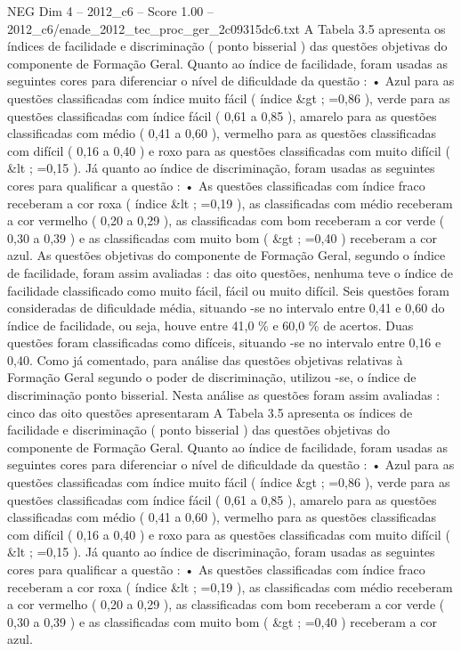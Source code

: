 \begin{textsample}{NEG Dim 4 – 2012\_c6 – Score 1.00 – 2012\_c6/enade\_2012\_tec\_proc\_ger\_2c09315dc6.txt}
A Tabela 3.5 apresenta os índices de facilidade e discriminação ( ponto bisserial ) das questões objetivas do componente de Formação Geral.
Quanto ao índice de facilidade, foram usadas as seguintes cores para diferenciar o nível de dificuldade da questão : • Azul para as questões classificadas com índice muito fácil ( índice \&gt ; =0,86 ), verde para as questões classificadas com índice fácil ( 0,61 a 0,85 ), amarelo para as questões classificadas com médio ( 0,41 a 0,60 ), vermelho para as questões classificadas com difícil ( 0,16 a 0,40 ) e roxo para as questões classificadas com muito difícil ( \&lt ; =0,15 ).
Já quanto ao índice de discriminação, foram usadas as seguintes cores para qualificar a questão : • As questões classificadas com índice fraco receberam a cor roxa ( índice \&lt ; =0,19 ), as classificadas com médio receberam a cor vermelho ( 0,20 a 0,29 ), as classificadas com bom receberam a cor verde ( 0,30 a 0,39 ) e as classificadas com muito bom ( \&gt ; =0,40 ) receberam a cor azul.
As questões objetivas do componente de Formação Geral, segundo o índice de facilidade, foram assim avaliadas : das oito questões, nenhuma teve o índice de facilidade classificado como muito fácil, fácil ou muito difícil.
Seis questões foram consideradas de dificuldade média, situando -se no intervalo entre 0,41 e 0,60 do índice de facilidade, ou seja, houve entre 41,0 \% e 60,0 \% de acertos.
Duas questões foram classificadas como difíceis, situando -se no intervalo entre 0,16 e 0,40.
Como já comentado, para análise das questões objetivas relativas à Formação Geral segundo o poder de discriminação, utilizou -se, o índice de discriminação ponto bisserial.
Nesta análise as questões foram assim avaliadas : cinco das oito questões apresentaram A Tabela 3.5 apresenta os índices de facilidade e discriminação ( ponto bisserial ) das questões objetivas do componente de Formação Geral.
Quanto ao índice de facilidade, foram usadas as seguintes cores para diferenciar o nível de dificuldade da questão : • Azul para as questões classificadas com índice muito fácil ( índice \&gt ; =0,86 ), verde para as questões classificadas com índice fácil ( 0,61 a 0,85 ), amarelo para as questões classificadas com médio ( 0,41 a 0,60 ), vermelho para as questões classificadas com difícil ( 0,16 a 0,40 ) e roxo para as questões classificadas com muito difícil ( \&lt ; =0,15 ).
Já quanto ao índice de discriminação, foram usadas as seguintes cores para qualificar a questão : • As questões classificadas com índice fraco receberam a cor roxa ( índice \&lt ; =0,19 ), as classificadas com médio receberam a cor vermelho ( 0,20 a 0,29 ), as classificadas com bom receberam a cor verde ( 0,30 a 0,39 ) e as classificadas com muito bom ( \&gt ; =0,40 ) receberam a cor azul.

\end{textsample}
